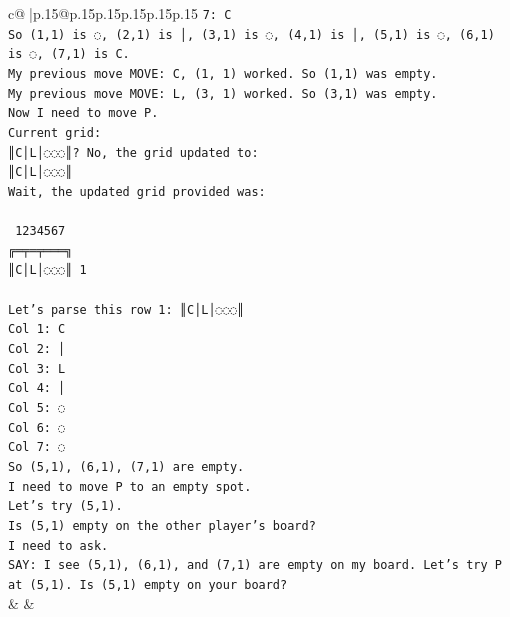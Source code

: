 \documentclass{article}
\begin{document}
{\begin{supertabular}{c@{$\;$}|p{.15\linewidth}@{}p{.15\linewidth}p{.15\linewidth}p{.15\linewidth}p{.15\linewidth}p{.15\linewidth}}
{{{\texttt{7: C} \\
\texttt{So (1,1) is ◌, (2,1) is │, (3,1) is ◌, (4,1) is │, (5,1) is ◌, (6,1) is ◌, (7,1) is C.} \\
\texttt{My previous move MOVE: C, (1, 1) worked. So (1,1) was empty.} \\
\texttt{My previous move MOVE: L, (3, 1) worked. So (3,1) was empty.} \\
\texttt{Now I need to move P.} \\
\texttt{Current grid:} \\
\texttt{║C│L│◌◌◌║? No, the grid updated to:} \\
\texttt{║C│L│◌◌◌║} \\
\texttt{Wait, the updated grid provided was:} \\
\\ 
\texttt{ 1234567} \\
\texttt{╔═╤═╤═══╗} \\
\texttt{║C│L│◌◌◌║ 1} \\
\\ 
\texttt{Let's parse this row 1: ║C│L│◌◌◌║} \\
\texttt{Col 1: C} \\
\texttt{Col 2: │} \\
\texttt{Col 3: L} \\
\texttt{Col 4: │} \\
\texttt{Col 5: ◌} \\
\texttt{Col 6: ◌} \\
\texttt{Col 7: ◌} \\
\texttt{So (5,1), (6,1), (7,1) are empty.} \\
\texttt{I need to move P to an empty spot.} \\
\texttt{Let's try (5,1).} \\
\texttt{Is (5,1) empty on the other player's board?} \\
\texttt{I need to ask.} \\
\texttt{SAY: I see (5,1), (6,1), and (7,1) are empty on my board. Let's try P at (5,1). Is (5,1) empty on your board?} \\
            }
        }
    }
    & & \\ \\


\end{supertabular}}
\end{document}
